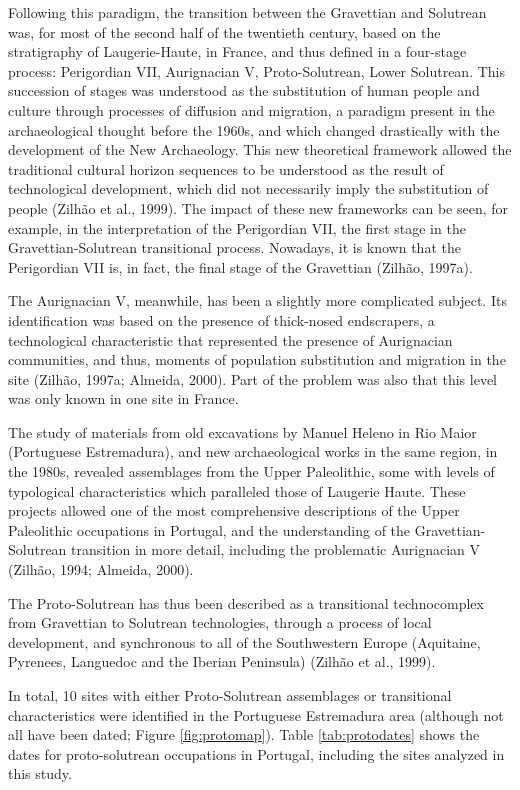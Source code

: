 \documentclass[12pt,twoside]{reedthesis}
\begin{document}
Following this paradigm, the transition between the Gravettian and Solutrean was, for most of the second half of the twentieth century, based on the stratigraphy of Laugerie-Haute, in France, and thus defined in a four-stage process: Perigordian VII, Aurignacian V, Proto-Solutrean, Lower Solutrean. This succession of stages was understood as the substitution of human people and culture through processes of diffusion and migration, a paradigm present in the archaeological thought before the 1960s, and which changed drastically with the development of the New Archaeology. This new theoretical framework allowed the traditional cultural horizon sequences to be understood as the result of technological development, which did not necessarily imply the substitution of people (Zilhão et al., 1999). The impact of these new frameworks can be seen, for example, in the interpretation of the Perigordian VII, the first stage in the Gravettian-Solutrean transitional process. Nowadays, it is known that the Perigordian VII is, in fact, the final stage of the Gravettian (Zilhão, 1997a).

The Aurignacian V, meanwhile, has been a slightly more complicated subject. Its identification was based on the presence of thick-nosed endscrapers, a technological characteristic that represented the presence of Aurignacian communities, and thus, moments of population substitution and migration in the site (Zilhão, 1997a; Almeida, 2000). Part of the problem was also that this level was only known in one site in France.

The study of materials from old excavations by Manuel Heleno in Rio Maior (Portuguese Estremadura), and new archaeological works in the same region, in the 1980s, revealed assemblages from the Upper Paleolithic, some with levels of typological characteristics which paralleled those of Laugerie Haute. These projects allowed one of the most comprehensive descriptions of the Upper Paleolithic occupations in Portugal, and the understanding of the Gravettian-Solutrean transition in more detail, including the problematic Aurignacian V (Zilhão, 1994; Almeida, 2000).

The Proto-Solutrean has thus been described as a transitional technocomplex from Gravettian to Solutrean technologies, through a process of local development, and synchronous to all of the Southwestern Europe (Aquitaine, Pyrenees, Languedoc and the Iberian Peninsula) (Zilhão et al., 1999).

In total, 10 sites with either Proto-Solutrean assemblages or transitional characteristics were identified in the Portuguese Estremadura area (although not all have been dated; Figure \ref{fig:protomap}). Table \ref{tab:protodates} shows the dates for proto-solutrean occupations in Portugal, including the sites analyzed in this study.
\end{document}
